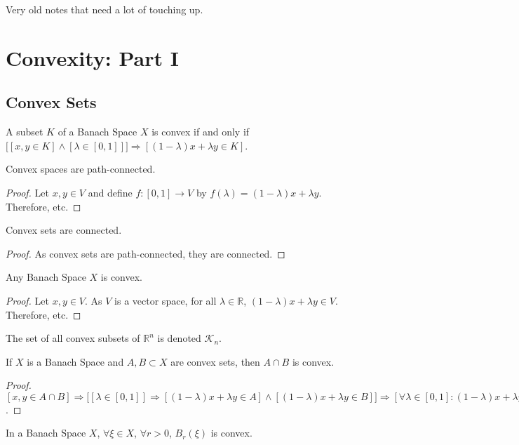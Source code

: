 Very old notes that need a lot of touching up.
\section{Convexity: Part I}
    \subsection{Convex Sets}
        \begin{definition}
        A subset $K$ of a Banach Space $X$ is convex if and only if $\big[[x,y\in K]\land  [\lambda \in [0,1]]\big]\Rightarrow[(1-\lambda)x+\lambda y\in K]$.
        \end{definition}
        \begin{theorem}
        Convex spaces are path-connected.
        \end{theorem}
        \begin{proof}
        Let $x,y\in V$ and define $f:[0,1]\rightarrow V$ by $f(\lambda) = (1-\lambda)x+\lambda y$. Therefore, etc.
        \end{proof}
        \begin{theorem}
        Convex sets are connected.
        \end{theorem}
        \begin{proof}
        As convex sets are path-connected, they are connected.
        \end{proof}
        \begin{theorem}
        Any Banach Space $X$ is convex.
        \end{theorem}
        \begin{proof}
        Let $x,y\in V$. As $V$ is a vector space, for all $\lambda \in \mathbb{R}$, $(1-\lambda)x+\lambda y\in V$. Therefore, etc.
        \end{proof}
        The set of all convex subsets of $\mathbb{R}^n$ is denoted $\mathscr{K}_n$.
        \begin{theorem}
        If $X$ is a Banach Space and $A,B\subset X$ are convex sets, then $A\cap B$ is convex.
        \end{theorem}
        \begin{proof}
        $[x,y \in A\cap B] \Rightarrow \big[[\lambda \in [0,1]]\Rightarrow[ (1-\lambda)x+\lambda y \in A]\land [ (1-\lambda)x+\lambda y \in B]\big] \Rightarrow [\forall \lambda \in [0,1]:(1-\lambda)x+\lambda y \in A\cap B]$. 
        \end{proof}
        \begin{theorem}
        In a Banach Space $X$, $\forall \xi \in X$, $\forall r>0$, $B_{r}(\xi)$ is convex.
        \end{theorem}
